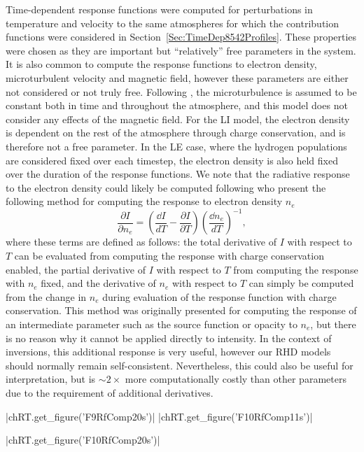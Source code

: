 Time-dependent response functions were computed for perturbations in temperature and velocity to the same atmospheres for which the contribution functions were considered in Section~\ref{Sec:TimeDep8542Profiles}.
These properties were chosen as they are important but ``relatively'' free parameters in the system.
It is also common to compute the response functions to electron density, microturbulent velocity and magnetic field, however these parameters are either not considered or not truly free.
Following \Radyn{}, the microturbulence is assumed to be constant both in time and throughout the atmosphere, and this model does not consider any effects of the magnetic field.
For the LI model, the electron density is dependent on the rest of the atmosphere through charge conservation, and is therefore not a free parameter.
In the LE case, where the hydrogen populations are considered fixed over each timestep, the electron density is also held fixed over the duration of the response functions.
We note that the radiative response to the electron density could likely be computed following \citet{Metcalf1990a} who present the following method for computing the response to electron density $n_e$
\begin{equation}
    \frac{\partial I}{\partial n_e} = \left( \frac{\dd{}I}{dT} - \frac{\partial I}{\partial T} \right)\left( \frac{\dd{}n_e}{dT} \right)^{-1},
\end{equation}
where these terms are defined as follows: the total derivative of $I$ with respect to $T$ can be evaluated from computing the response with charge conservation enabled, the partial derivative of $I$ with respect to $T$ from computing the response with $n_e$ fixed, and the derivative of $n_e$ with respect to $T$ can simply be computed from the change in $n_e$ during evaluation of the response function with charge conservation.
This method was originally presented for computing the response of an intermediate parameter such as the source function or opacity to $n_e$, but there is no reason why it cannot be applied directly to intensity.
In the context of inversions, this additional response is very useful, however our RHD models should normally remain self-consistent.
Nevertheless, this could also be useful for interpretation, but is $\sim2\times$ more computationally costly than other parameters due to the requirement of additional derivatives.

\py[TimeDepRT]|chRT.get_figure('F9RfComp20s')|
\py[TimeDepRT]|chRT.get_figure('F10RfComp11s')|

\py[TimeDepRT]|chRT.get_figure('F10RfComp20s')|

